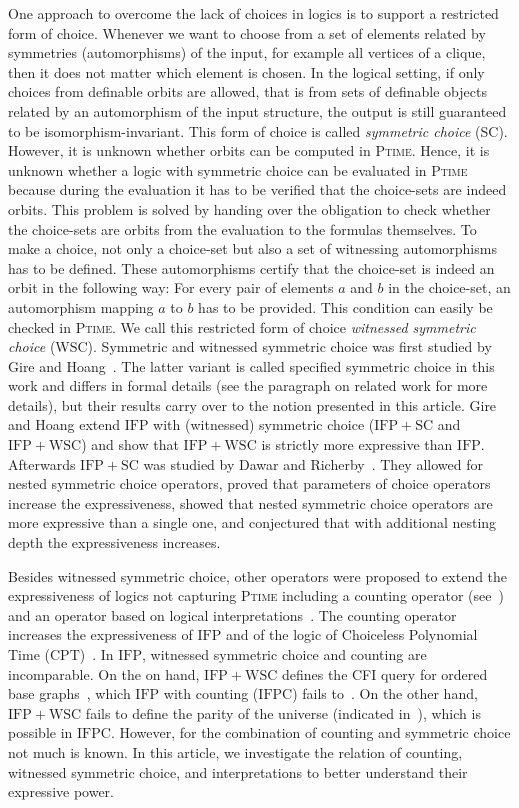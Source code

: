 \documentclass[]{lmcs}
\newcommand{\PTime}{\textsc{Ptime}}
\newcommand{\CPT}{\ensuremath{\mathrm{CPT}}}
\newcommand{\IFP}{\ensuremath{\mathrm{IFP}}}
\newcommand{\IFPSC}{\ensuremath{\mathrm{IFP{+}SC}}}
\newcommand{\IFPWSC}{\ensuremath{\mathrm{IFP{+}WSC}}}
\newcommand{\IFPC}{\ensuremath{\mathrm{IFPC}}}
\begin{document}
One approach to overcome the lack of choices in logics
is to support a restricted form of choice.
Whenever we want to choose from a set of  elements related by symmetries (automorphisms) of the input, for example all vertices of a clique, then it does not matter which element is chosen.
In the logical setting,
if only choices from definable orbits are allowed,
that is from sets of definable objects  related by an automorphism of the input structure,
the output is still guaranteed to be isomorphism-invariant.
This form of choice is called \emph{symmetric choice} (SC).
However, it is unknown whether orbits can be computed in \PTime{}.
Hence, it is unknown whether a logic with symmetric choice can be evaluated in \PTime{}
because during the evaluation
it has to be verified that the choice-sets are indeed orbits.
This problem is solved by handing over the obligation to check whether the choice-sets are orbits from the evaluation to the formulas themselves.
To make a choice, not only a choice-set but also
a set of witnessing automorphisms has to be defined.
These automorphisms certify that the choice-set is indeed an orbit
in the following way: For every pair of elements $a$ and $b$ in the choice-set,
an automorphism mapping $a$ to $b$  has to be provided.
This condition can easily be checked in \PTime{}.
We call this restricted form of choice \emph{witnessed symmetric choice} (WSC).
Symmetric and witnessed symmetric choice was first studied by Gire and Hoang~\cite{GireHoang98}. The latter variant is called specified symmetric choice in this work and differs in formal details (see the paragraph on related work for more details), but their results carry over to the notion presented in this article.
Gire and Hoang extend \IFP{} with (witnessed) symmetric choice (\IFPSC{} and \IFPWSC{}) and show that \IFPWSC{} is strictly more expressive than \IFP{}.
Afterwards \IFPSC{} was studied by Dawar and Richerby~\cite{DawarRicherby03}.
They allowed for nested symmetric choice operators,
proved that parameters of choice operators increase the expressiveness,
showed that nested symmetric choice operators are more expressive
than a single one,
and conjectured that with additional nesting depth
the expressiveness increases.


Besides witnessed symmetric choice,
other operators were proposed to extend 
the expressiveness of logics not capturing \PTime{}
including a counting operator (see~\cite{Otto1997}) and an operator based on logical interpretations~\cite{GireHoang98}.
The counting operator increases the expressiveness of
\IFP{} and of the logic of Choiceless Polynomial Time (\CPT{})~\cite{BlassGS02}.
In \IFP{}, witnessed symmetric choice and counting are incomparable.
On the on hand, \IFPWSC{{}} defines the CFI query for ordered base graphs~\cite{GireHoang98},
which \IFP{} with counting (\IFPC) fails to~\cite{CaiFI1992}.
On the other hand, \IFPWSC{} fails to define the parity of the universe (indicated in~\cite{GireHoang98}),
which is possible in \IFPC{}.
However, for the combination of counting and symmetric choice not much is known.
In this article, we investigate the relation of counting, witnessed symmetric choice,
and interpretations to better understand their expressive power.
\end{document}
